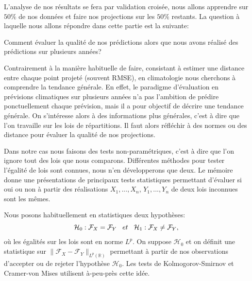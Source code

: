 \documentclass[a4paper,11pt]{article}
\numberwithin{equation}{section}
\begin{document}
L'analyse de nos résultats se fera par validation croisée, nous allons apprendre sur $50\%$ de nos données et faire nos projections sur les $50\%$ restants. La question à laquelle nous allons répondre dans cette partie est la suivante:

Comment évaluer la qualité de nos prédictions alors que nous avons réalisé des prédictions sur plusieurs années?

Contrairement à la manière habituelle de faire, consistant à estimer une distance entre chaque point projeté (souvent RMSE), en climatologie nous cherchons à comprendre la tendance générale. En effet, le paradigme d'évaluation en prévisions climatiques sur plusieurs années n'a pas l'ambition de prédire ponctuellement chaque prévision, mais il a pour objectif de décrire une tendance générale. On s'intéresse alors à des informations plus générales, c'est à dire que l'on travaille sur les lois de répartitions. Il faut alors réfléchir à des normes ou des distance pour évaluer la qualité de nos projections.  

\vspace{0.7cm}

Dans notre cas nous faisons des tests non-paramétriques, c'est à dire que l'on ignore tout des lois que nous comparons.
Différentes méthodes pour tester l'égalité de lois sont connues, nous n'en développerons que deux. Le mémoire \cite{ethier2011propos} donne une présentations de principaux tests statistiques permettant d'évaluer si oui ou non à partir des réalisations $X_1,...,X_n$, $Y_1,...,Y_n$ de deux lois inconnues sont les mêmes. 

Nous posons habituellement en statistiques deux hypothèses:
\[ \mathcal{H}_0: \mathcal{F}_{X} = \mathcal{F}_{Y} \hspace{3mm} et \hspace{3mm} \mathcal{H}_1: \mathcal{F}_{X} \neq \mathcal{F}_{Y},\]
où les égalités sur les lois sont en norme $L^p$. On suppose $\mathcal{H}_0$ et on définit une statistique sur $\|\mathcal{F}_{X}-\mathcal{F}_{Y}\|_{L^p(\mathbb{R})}$ permettant à partir de nos observations d'accepter ou de rejeter l'hypothèse $\mathcal{H}_0$.
Les tests de Kolmogorov-Smirnov et Cramer-von Mises utilisent à-peu-près cette idée. 
\end{document}
